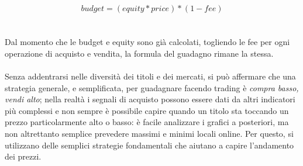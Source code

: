 \documentclass[a4paper,12pt]{report}
\begin{document}
\begin{equation}
budget=(equity*price)*(1-fee)
\end{equation}
\\~\\ Dal momento che le budget e equity sono già calcolati, togliendo le fee per ogni operazione di acquisto e vendita, la formula del guadagno rimane la stessa.\\~\\
Senza addentrarsi nelle diversità dei titoli e dei mercati, si può affermare che una strategia generale, e semplificata, per guadagnare facendo trading è \textit{compra basso, vendi alto}; nella realtà i segnali di acquisto possono essere dati da altri indicatori più complessi e non sempre è possibile capire quando un titolo sta toccando un prezzo particolarmente alto o basso: è facile analizzare i grafici a posteriori, ma non altrettanto semplice prevedere massimi e minimi locali online. Per questo, si utilizzano delle semplici strategie fondamentali che aiutano a capire l'andamento dei prezzi.
\end{document}

